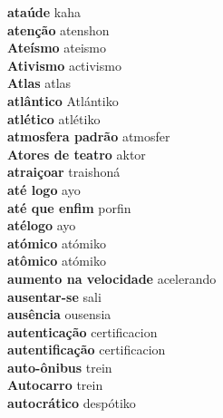 \textbf{ ataúde  } kaha \\
\textbf{ atenção  } atenshon \\
\textbf{ Ateísmo  } ateismo \\
\textbf{ Ativismo  } activismo \\
\textbf{ Atlas  } atlas \\
\textbf{ atlântico  } Atlántiko \\
\textbf{ atlético  } atlétiko \\
\textbf{ atmosfera padrão  } atmosfer \\
\textbf{ Atores de teatro  } aktor \\
\textbf{ atraiçoar  } traishoná \\
\textbf{ até logo  } ayo \\
\textbf{ até que enfim  } porfin \\
\textbf{ atélogo  } ayo \\
\textbf{ atómico  } atómiko \\
\textbf{ atômico  } atómiko \\
\textbf{ aumento na velocidade  } acelerando \\
\textbf{ ausentar-se  } sali \\
\textbf{ ausência  } ousensia \\
\textbf{ autenticação  } certificacion \\
\textbf{ autentificação  } certificacion \\
\textbf{ auto-ônibus  } trein \\
\textbf{ Autocarro  } trein \\
\textbf{ autocrático  } despótiko \\
